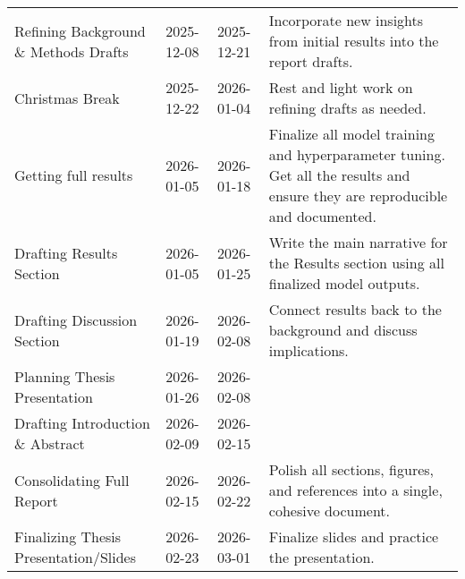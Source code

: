 \documentclass[12pt, a4paper]{article}
\begin{document}
\begin{table}[h!]
{\begin{tabularx}{\textwidth}{>{\RaggedRight}X l l >{\RaggedRight}X}
            Refining Background \& Methods Drafts                & 2025-12-08          & 2025-12-21          & Incorporate new insights from initial results into the report drafts.                                                       \\

            Christmas Break                                               & 2025-12-22          & 2026-01-04          & Rest and light work on refining drafts as needed.                                                                           \\

            Getting full results                                          & 2026-01-05          & 2026-01-18          & Finalize all model training and hyperparameter tuning. Get all the results and ensure they are reproducible and documented. \\

            Drafting Results Section                             & 2026-01-05          & 2026-01-25          & Write the main narrative for the Results section using all finalized model outputs.                                         \\

            Drafting Discussion Section                          & 2026-01-19          & 2026-02-08          & Connect results back to the background and discuss implications.                                                            \\

            Planning Thesis Presentation                                  & 2026-01-26          & 2026-02-08          &                                                                                                                             \\

            Drafting Introduction \& Abstract                             & 2026-02-09          & 2026-02-15          &                                                                                                                             \\

            Consolidating Full Report                                     & 2026-02-15          & 2026-02-22          & Polish all sections, figures, and references into a single, cohesive document.                                              \\

            Finalizing Thesis Presentation/Slides                         & 2026-02-23          & 2026-03-01          & Finalize slides and practice the presentation.                                                                              \\


\end{tabularx}}
\end{table}
\end{document}
